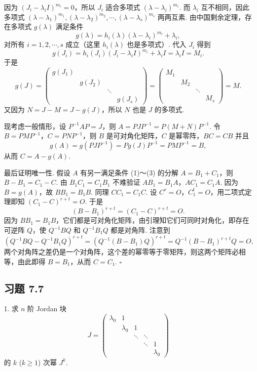 \documentclass[UTF8, 12pt, fontset=fandol, oneside]{ctexart}
\begin{document}
因为 $(J_i-\lambda_iI)^{m_i}=0$，所以 $J_i$ 适合多项式 $(\lambda-\lambda_i)^{m_i}$. 而 $\lambda_i$ 互不相同，因此多项式 $(\lambda-\lambda_1)^{m_1},(\lambda-\lambda_2)^{m_2},\cdots,(\lambda-\lambda_s)^{m_s}$ 两两互素. 由中国剩余定理，存在多项式 $g(\lambda)$ 满足条件
\[
g(\lambda)=h_i(\lambda)(\lambda-\lambda_i)^{m_i}+\lambda_i,
\]
对所有 $i=1,2,\cdots,s$ 成立（这里 $h_i(\lambda)$ 也是多项式）. 代入 $J_i$ 得到
\[
g(J_i)=h_i(J_i)(J_i-\lambda_iI)^{m_i}+\lambda_iI=\lambda_iI=M_i.
\]
于是
\[
g(J)=\left(\begin{array}{cccc}
g(J_1) & & & \\
& g(J_2) & & \\
& & \ddots & \\
& & & g(J_s)
\end{array}\right)
=\left(\begin{array}{cccc}
M_1 & & & \\
& M_2 & & \\
& & \ddots & \\
& & & M_s
\end{array}\right)=M.
\]
又因为 $N=J-M=J-g(J)$，所以 $N$ 也是 $J$ 的多项式.

现考虑一般情形，设 $P^{-1}AP=J$，则 $A=PJP^{-1}=P(M+N)P^{-1}$. 令 $B=PMP^{-1}$，$C=PNP^{-1}$，则 $B$ 是可对角化矩阵，$C$ 是幂零阵，$BC=CB$ 并且
\[
g(A)=g(PJP^{-1})=Pg(J)P^{-1}=PMP^{-1}=B,
\]
从而 $C=A-g(A)$.

最后证明唯一性. 假设 $A$ 有另一满足条件 (1)～(3) 的分解 $A=B_1+C_1$，则 $B-B_1=C_1-C$. 由 $B_1C_1=C_1B_1$ 不难验证 $AB_1=B_1A$，$AC_1=C_1A$. 因为 $B=g(A)$，故 $BB_1=B_1B$. 同理 $CC_1=C_1C$. 设 $C^r=O$，$C_1^t=O$，用二项式定理即知 $(C_1-C)^{r+t}=O$. 于是
\[
(B-B_1)^{r+t}=(C_1-C)^{r+t}=O.
\]
因为 $BB_1=B_1B$，它们都是可对角化矩阵，由引理知它们可同时对角化，即存在可逆阵 $Q$，使 $Q^{-1}BQ$ 和 $Q^{-1}B_1Q$ 都是对角阵. 注意到
\[
(Q^{-1}BQ-Q^{-1}B_1Q)^{r+t}=(Q^{-1}(B-B_1)Q)^{r+t}=Q^{-1}(B-B_1)^{r+t}Q=O,
\]
两个对角阵之差仍是一个对角阵，这个差的幂零等于零矩阵，则这两个矩阵必相等，由此即得 $B=B_1$，从而 $C=C_1$. $\square$

\subsection*{习题 7.7}

1. 求 $n$ 阶 Jordan 块
\[
J=\left(\begin{array}{ccccc}
\lambda_0 & 1 & & & \\
& \lambda_0 & 1 & & \\
& & \ddots & \ddots & \\
& & & \ddots & 1\\
& & & & \lambda_0
\end{array}\right)
\]
的 $k$ ($k\geq 1$) 次幂 $J^k$.
\end{document}
